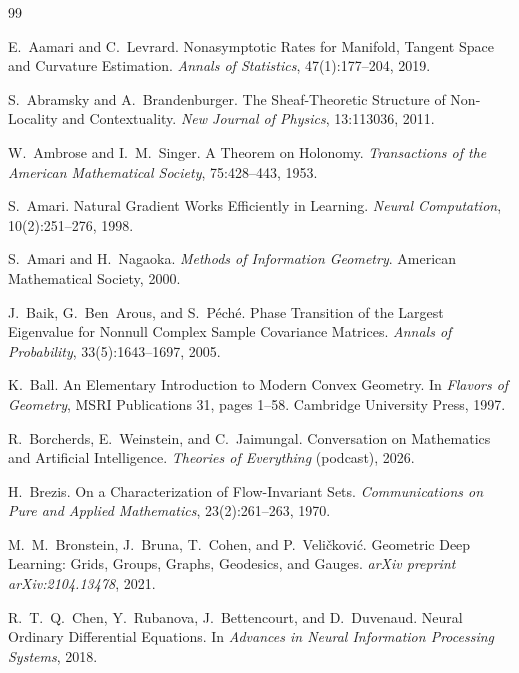 \documentclass[11pt,a4paper]{article}
\theoremstyle{definition}
\theoremstyle{remark}
\begin{document}
\begin{thebibliography}{99}

E.~Aamari and C.~Levrard.
\newblock Nonasymptotic Rates for Manifold, Tangent Space and Curvature Estimation.
\newblock \emph{Annals of Statistics}, 47(1):177--204, 2019.

S.~Abramsky and A.~Brandenburger.
\newblock The Sheaf-Theoretic Structure of Non-Locality and Contextuality.
\newblock \emph{New Journal of Physics}, 13:113036, 2011.

W.~Ambrose and I.~M.~Singer.
\newblock A Theorem on Holonomy.
\newblock \emph{Transactions of the American Mathematical Society}, 75:428--443, 1953.

S.~Amari.
\newblock Natural Gradient Works Efficiently in Learning.
\newblock \emph{Neural Computation}, 10(2):251--276, 1998.

S.~Amari and H.~Nagaoka.
\newblock \emph{Methods of Information Geometry}.
\newblock American Mathematical Society, 2000.

J.~Baik, G.~Ben~Arous, and S.~P\'ech\'e.
\newblock Phase Transition of the Largest Eigenvalue for Nonnull Complex Sample Covariance Matrices.
\newblock \emph{Annals of Probability}, 33(5):1643--1697, 2005.

K.~Ball.
\newblock An Elementary Introduction to Modern Convex Geometry.
\newblock In \emph{Flavors of Geometry}, MSRI Publications 31, pages 1--58. Cambridge University Press, 1997.

R.~Borcherds, E.~Weinstein, and C.~Jaimungal.
\newblock Conversation on Mathematics and Artificial Intelligence.
\newblock \emph{Theories of Everything} (podcast), 2026.

H.~Brezis.
\newblock On a Characterization of Flow-Invariant Sets.
\newblock \emph{Communications on Pure and Applied Mathematics}, 23(2):261--263, 1970.

M.~M.~Bronstein, J.~Bruna, T.~Cohen, and P.~Veli\v{c}kovi\'c.
\newblock Geometric Deep Learning: Grids, Groups, Graphs, Geodesics, and Gauges.
\newblock \emph{arXiv preprint arXiv:2104.13478}, 2021.

R.~T.~Q.~Chen, Y.~Rubanova, J.~Bettencourt, and D.~Duvenaud.
\newblock Neural Ordinary Differential Equations.
\newblock In \emph{Advances in Neural Information Processing Systems}, 2018.


\end{thebibliography}
\end{document}
